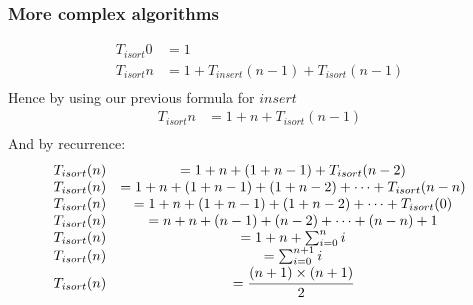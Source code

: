 \documentclass{report}
\begin{document}
\subsubsection*{More complex algorithms}
\[\begin{matrix}
		T_{isort} 0 & = 1                                    \\
		T_{isort} n & = 1 + T_{insert}(n-1) + T_{isort}(n-1) \\
	\end{matrix}\]
Hence by using our previous formula for $insert$
\[\begin{matrix}
		T_{isort} n & = 1 + n + T_{isort}(n-1) \\
	\end{matrix}\]
And by recurrence:
\[\begin{matrix}
		T_{isort} (n) & = 1 + n + (1 + n - 1) + T_{isort}(n-2)                       \\
		T_{isort} (n) & = 1 + n + (1 + n - 1) + (1 + n - 2) + \dots + T_{isort}(n-n) \\
		T_{isort} (n) & = 1 + n + (1 + n - 1) + (1 + n - 2) + \dots + T_{isort}(0)   \\
		T_{isort} (n) & = n + n + (n - 1) + (n - 2) + \dots + (n-n) + 1              \\
		T_{isort} (n) & = 1 + n + \sum_{i = 0}^n{i}                                  \\
		T_{isort} (n) & =  \sum_{i = 0}^{n+1}{i}                                     \\
		T_{isort} (n) & =  \cfrac{(n+1)\times(n+1)}{2}                               \\
	\end{matrix}\]
\end{document}
